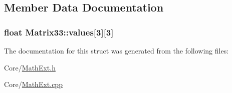 \subsection{Member Data Documentation}
\subsubsection[{\texorpdfstring{values}{values}}]{\setlength{\rightskip}{0pt plus 5cm}float Matrix33\+::values\mbox{[}3\mbox{]}\mbox{[}3\mbox{]}}\hypertarget{structMatrix33_a2844bb64a3b8e9b3ac3357c41c05f56d}{}\label{structMatrix33_a2844bb64a3b8e9b3ac3357c41c05f56d}


The documentation for this struct was generated from the following files\+:\begin{DoxyCompactItemize}
\item 
Core/\hyperlink{MathExt_8h}{Math\+Ext.\+h}\item 
Core/\hyperlink{MathExt_8cpp}{Math\+Ext.\+cpp}\end{DoxyCompactItemize}
